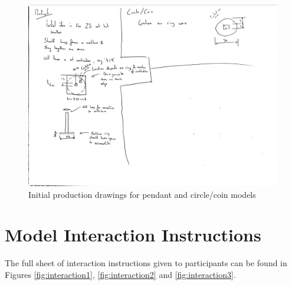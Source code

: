 \documentclass{l4proj}
\begin{document}
\begin{appendices}
\begin{figure}
    \centering
    \includegraphics[width=\linewidth]{Appendices/prod_3.jpg}
    \caption{Initial production drawings for pendant and circle/coin models}
    \label{fig:prod3}
\end{figure}
\clearpage

\chapter{Model Interaction Instructions}
\label{sec:instructions}

The full sheet of interaction instructions given to participants can be found in Figures \ref{fig:interaction1}, \ref{fig:interaction2} and \ref{fig:interaction3}.


\end{appendices}
\end{document}
